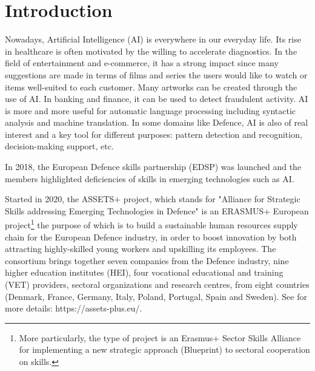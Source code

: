 \documentclass[conference]{IEEEtran}
\begin{document}
\section{Introduction}
Nowadays, Artificial Intelligence (AI) is everywhere in our everyday life. Its rise in healthcare is often motivated by the willing to accelerate diagnostics. In the field of entertainment and e-commerce, it has a strong impact since many suggestions are made in terms of films and series the users would like to watch or items well-suited to each customer. Many artworks can be created through the use of AI. In banking and finance, it can be used to detect fraudulent activity. AI is more and more useful for  automatic language processing including
syntactic analysis and machine translation. In some domains like Defence, AI is also of real interest and a key tool for different purposes: pattern detection and recognition, decision-making support, etc.

\noindent In 2018,  the European Defence skills partnership (EDSP) was launched and the members highlighted deficiencies of skills in emerging technologies such as AI.

\noindent Started in 2020, the ASSETS+ project, which stands for "Alliance for Strategic Skills addressing Emerging Technologies in Defence"  is an ERASMUS+ European project\footnote{More particularly, the type of project is an Erasmus+ Sector Skills Alliance for implementing a new strategic approach (Blueprint) to sectoral cooperation on skills.} the purpose of which is to build a sustainable human resources supply chain for the European Defence industry, in order to boost innovation by both attracting highly-skilled young workers and upskilling its employees.  The consortium brings together seven companies from the Defence industry, nine higher education institutes (HEI), four vocational educational and training (VET) providers, sectoral organizations and research centres, from eight countries (Denmark, France, Germany, Italy, Poland, Portugal, Spain and Sweden). See for more details: https://assets-plus.eu/.
\end{document}

